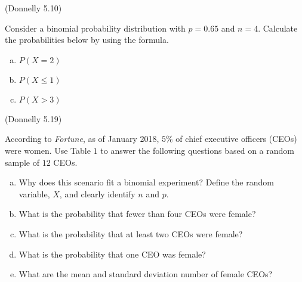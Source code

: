 \documentclass[12pt, letterpaper]{article}
\newcounter{exercise}
\theoremstyle{definition}
\begin{document}
\begin{exercise}  (Donnelly 5.10)

Consider a binomial probability distribution with $p=0.65$ and $n=4$.  Calculate the probabilities below by using the formula.

\end{exercise}

\begin{enumerate}[(a)]

\item $P(X=2)$

\vfill

\item $P(X\leq 1)$

\vfill

\item $P(X>3)$

\vfill

\end{enumerate}

\newpage



\begin{exercise} (Donnelly 5.19)

According to \textit{Fortune}, as of January 2018, $5\%$ of chief executive officers (CEOs) were women.  Use Table $1$ to answer the following questions based on a random sample of $12$ CEOs.

\end{exercise}

\begin{enumerate}[(a)]

\item Why does this scenario fit a binomial experiment?  Define the random variable, $X$, and clearly identify $n$ and $p$.

\vfill
\vfill
\vfill

\item What is the probability that fewer than four CEOs were female?

\vfill

\item What is the probability that at least two CEOs were female?

\vfill

\item What is the probability that one CEO was female?

\vfill

\item What are the mean and standard deviation number of female CEOs?

\vfill

\end{enumerate}
\end{document}
